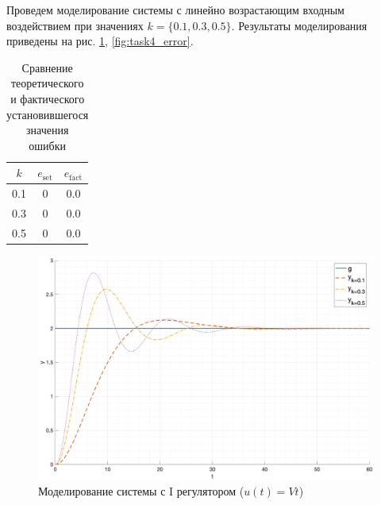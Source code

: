
Проведем моделирование системы с линейно возрастающим входным воздействием при значениях $k = \{0.1, 0.3, 0.5\}$.
Результаты моделирования приведены на рис. \ref{fig:task4_out}, \ref{fig:task4_error}.

\begin{table}
    \centering
    \begin{tabular}{|c|c|c|}
        \hline
        $k$ & $e_{\text{set}}$ & $e_{\text{fact}}$ \\
        \hline
        0.1 & 0 & 0.0 \\
        0.3 & 0 & 0.0 \\
        0.5 & 0 & 0.0 \\
        \hline
    \end{tabular}
    \caption{Сравнение теоретического и фактического установившегося значения ошибки}
\end{table}

\begin{figure}[ht!]
    \centering
    \includegraphics[width=\textwidth]{"media/plots/task4_out1.png"}
    \caption{Моделирование системы с I регулятором ($u(t) = Vt$)}
    \label{fig:task4_out}
\end{figure}

